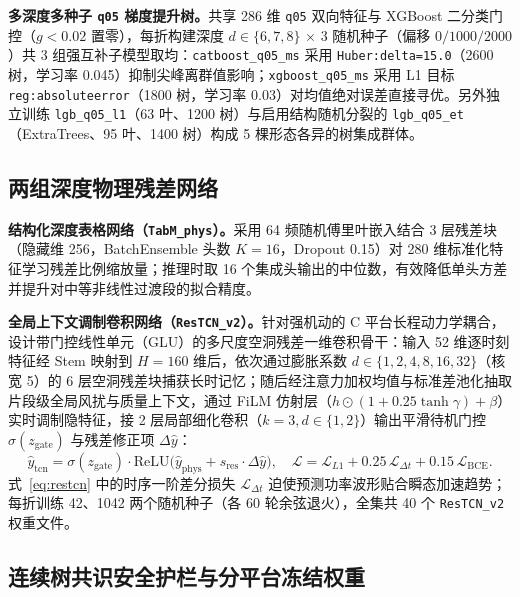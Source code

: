 \documentclass[UTF8,a4paper,11pt,fontset=windows]{ctexart}
\newcommand{\code}[1]{\texttt{#1}}
\begin{document}
\textbf{多深度多种子 \texttt{q05} 梯度提升树。}共享 286 维 \code{q05} 双向特征与 XGBoost 二分类门控（$g<0.02$ 置零），每折构建深度 $d\in\{6,7,8\}$ $\times$ 3 随机种子（偏移 $0/1000/2000$）共 3 组强互补子模型取均：\code{catboost\_q05\_ms} 采用 \code{Huber:delta=15.0}（2600 树，学习率 0.045）抑制尖峰离群值影响；\code{xgboost\_q05\_ms} 采用 L1 目标 \code{reg:absoluteerror}（1800 树，学习率 0.03）对均值绝对误差直接寻优。另外独立训练 \code{lgb\_q05\_l1}（63 叶、1200 树）与启用结构随机分裂的 \code{lgb\_q05\_et}（ExtraTrees、95 叶、1400 树）构成 5 棵形态各异的树集成群体。

\subsection{两组深度物理残差网络}

\textbf{结构化深度表格网络（\texttt{TabM\_phys}）。}采用 64 频随机傅里叶嵌入结合 3 层残差块（隐藏维 256，BatchEnsemble 头数 $K=16$，Dropout 0.15）对 280 维标准化特征学习残差比例缩放量；推理时取 16 个集成头输出的中位数，有效降低单头方差并提升对中等非线性过渡段的拟合精度。

\textbf{全局上下文调制卷积网络（\texttt{ResTCN\_v2}）。}针对强机动的 C 平台长程动力学耦合，设计带门控线性单元（GLU）的多尺度空洞残差一维卷积骨干：输入 52 维逐时刻特征经 Stem 映射到 $H=160$ 维后，依次通过膨胀系数 $d\in\{1,2,4,8,16,32\}$（核宽 5）的 6 层空洞残差块捕获长时记忆；随后经注意力加权均值与标准差池化抽取片段级全局风扰与质量上下文，通过 FiLM 仿射层（$h\odot(1+0.25\tanh\gamma)+\beta$）实时调制隐特征，接 2 层局部细化卷积（$k=3, d\in\{1,2\}$）输出平滑待机门控 $\sigma(z_{\mathrm{gate}})$ 与残差修正项 $\Delta\hat y$：
\begin{equation}
  \hat y_{\mathrm{tcn}} = \sigma(z_{\mathrm{gate}}) \cdot \mathrm{ReLU}\bigl(\hat y_{\mathrm{phys}} + s_{\mathrm{res}}\cdot \Delta\hat y\bigr),\quad
  \mathcal{L} = \mathcal{L}_{L1} + 0.25\,\mathcal{L}_{\Delta t} + 0.15\,\mathcal{L}_{\mathrm{BCE}}.
  \label{eq:restcn}
\end{equation}
式~\eqref{eq:restcn} 中的时序一阶差分损失 $\mathcal{L}_{\Delta t}$ 迫使预测功率波形贴合瞬态加速趋势；每折训练 42、1042 两个随机种子（各 60 轮余弦退火），全集共 40 个 \code{ResTCN\_v2} 权重文件。

\subsection{连续树共识安全护栏与分平台冻结权重}
\end{document}
